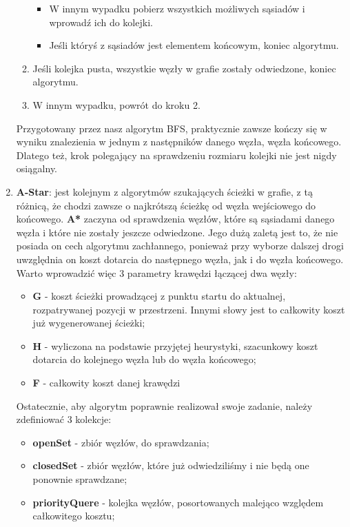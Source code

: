 \documentclass{classrep}
\begin{document}
\begin{enumerate}
\begin{enumerate}
\begin{itemize}
					\item W innym wypadku pobierz wszystkich możliwych sąsiadów i wprowadź ich do kolejki.
					\item Jeśli któryś z sąsiadów jest elementem końcowym, koniec algorytmu. 
				\end{itemize}
				\item Jeśli kolejka pusta, wszystkie węzły w grafie zostały odwiedzone, koniec algorytmu.
				\item W innym wypadku, powrót do kroku 2.
			\end{enumerate}
			Przygotowany przez nasz algorytm BFS, praktycznie zawsze kończy się w wyniku znalezienia
			w jednym z następników danego węzła, węzła końcowego. Dlatego też, krok polegający na 
			sprawdzeniu rozmiaru kolejki nie jest nigdy osiągalny.
			\item \textbf{A-Star}: jest kolejnym z algorytmów szukających ścieżki w grafie, z tą
			różnicą, że chodzi zawsze o najkrótszą ścieżkę od węzła wejściowego do końcowego. \textbf{A*}
			zaczyna od sprawdzenia węzłów, które są sąsiadami danego węzła i które nie zostały jeszcze odwiedzone.
			Jego dużą zaletą jest to, że nie posiada on cech algorytmu zachłannego, ponieważ przy
			wyborze dalszej drogi uwzględnia on koszt dotarcia do następnego węzła, jak i do węzła końcowego.
			Warto wprowadzić więc 3 parametry krawędzi łączącej dwa węzły:
			\begin{itemize}
				\item \textbf{G} - koszt ścieżki prowadzącej z punktu startu do aktualnej, rozpatrywanej pozycji
				w przestrzeni. Innymi słowy jest to całkowity koszt już wygenerowanej ścieżki;
				\item \textbf{H} - wyliczona na podstawie przyjętej heurystyki, szacunkowy koszt dotarcia do
				kolejnego węzła lub do węzła końcowego;
				\item \textbf{F} - całkowity koszt danej krawędzi
			\end{itemize}
			Ostatecznie, aby algorytm poprawnie realizował swoje zadanie, należy zdefiniować 3 kolekcje:
			\begin{itemize}
				\item \textbf{openSet} - zbiór węzłów, do sprawdzania;
				\item \textbf{closedSet} - zbiór węzłów, które już odwiedziliśmy i nie będą one ponownie sprawdzane;
				\item \textbf{priorityQuere} - kolejka węzłów, posortowanych malejąco względem całkowitego kosztu;
			\end{itemize}
		\end{enumerate}
		
\end{document}
